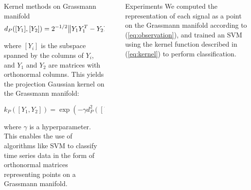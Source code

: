 \documentclass[final]{beamer}
\newlength{\sepwid}
\newlength{\onecolwid}
\begin{document}
\begin{frame}[t]
\begin{columns}[t]
\begin{column}{\onecolwid}
\begin{block}{Kernel methods on Grassmann manifold}
    \begin{equation}
        d_P([Y_1], [Y_2]) = 2^{-1/2} \norm{Y_1Y_1^T - Y_2Y_2^T}_F
    \end{equation}

    where $[Y_i]$ is the subspace spanned by the columns of $Y_i$, and $Y_1$ and $Y_2$ are
    matrices with orthonormal columns. This yields the projection Gaussian kernel on the Grassmann
    manifold:

    \begin{equation}\label{eq:kernel}
        k_P([Y_1, Y_2]) = \exp(-\gamma d_P^2([Y_1], [Y_2]))
    \end{equation}

    where $\gamma$ is a hyperparameter. This enables the use of algorithms like SVM to classify time
    series data in the form of orthonormal matrices representing points on a Grassmann manifold.
\end{block}


\end{column} %

\begin{column}{\sepwid}\end{column} %

\begin{column}{\onecolwid} %


\begin{block}{Experiments}
    We computed the representation of each signal as a point on the Grassmann manifold
    according to (\ref{eq:observation}), and trained an SVM using the kernel function described in
    (\ref{eq:kernel}) to perform classification.


\end{block}
\end{column}
\end{columns}
\end{frame}
\end{document}
